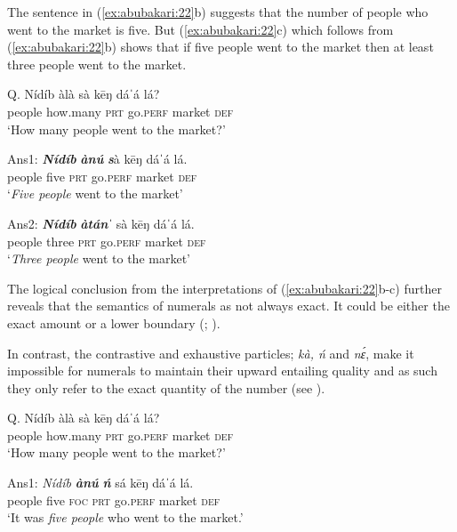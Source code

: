 \documentclass[output=paper
,newtxmath
,modfonts
,nonflat]{langsci/langscibook}
\begin{document}
 The sentence in (\ref{ex:abubakari:22}b) suggests that the number of people who went to the market is five. But (\ref{ex:abubakari:22}c) which follows from (\ref{ex:abubakari:22}b) shows that if five people went to the market then at least three people went to the market. 

 
\ea\label{ex:abubakari:22}
\ea\label{ex:abubakari:22a} 
Q. \gll Nídíb  àlà    sà  k\={e}ŋ dáˈá  lá? \\
people  how.many  \textsc{prt}  go.\textsc{perf} market  \textsc{def}\\                
\glt ‘How many people went to the market?’ 
 
\ex\label{ex:abubakari:22b} 
Ans1: \gll \textbf{\textit{Nídíb}}    \textbf{\textit{ànú}}  \textbf{\textit{s}}à  k\={e}ŋ dáˈá  lá.\\ 
people    five  \textsc{prt}  go.\textsc{perf} market  \textsc{def}\\
\glt ‘\textit{Five people} went to the market’ 

\ex\label{ex:abubakari:22c} 
Ans2: \gll \textbf{\textit{Nídíb}}    \textbf{\textit{àtánˈ}} sà  k\={e}ŋ dáˈá  lá.\\
people    three  \textsc{prt}  go.\textsc{perf} market  \textsc{def}\\
\glt ‘\textit{Three people} went to the market’
\z
\z

The logical conclusion from the interpretations of (\ref{ex:abubakari:22}b-c) further reveals that the semantics of numerals as not always exact. It could be either the exact amount or a lower boundary (\citealt{horn1972,levinson2000}; \citealt[cf][15]{vanderWal2013}).

In contrast, the contrastive and exhaustive  particles; \textit{kà, ń} and \textit{nɛ́}, make it impossible for numerals to maintain their upward entailing quality and as such they only refer to the exact quantity of the number (see \citealt{vanKuppevelt1996,vanRooij2002,vanRooij2004}).

 
\ea\label{ex:abubakari:23}
\ea\label{ex:abubakari:23a} 
Q. \gll Nídíb  àlà    sà  k\={e}ŋ dáˈá  lá?\\
people  how.many  \textsc{prt}  go.\textsc{perf} market  \textsc{def}\\                 
\glt ‘How many people went to the market?’ 

\ex\label{ex:abubakari:23b}
Ans1: \gll \textit{Nídíb} \textbf{\textit{ànú}} \textbf{\textit{ń} } sá  k\={e}ŋ  dáˈá    lá.  \\                             people  five  \textsc{foc}  \textsc{prt}  go.\textsc{perf} market    \textsc{def}\\
\glt ‘It was \textit{five people} who went to the market.’
\end{document}
